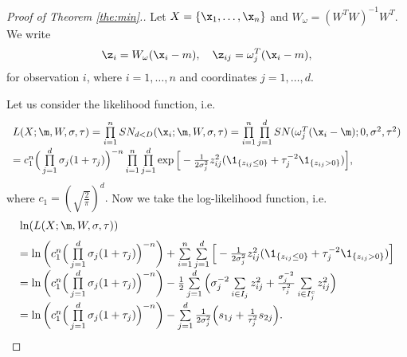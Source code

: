\begin{proof}[Proof of Theorem \ref{the:min}.]
Let $X=\{ \x_1, \ldots, \x_n \}$ and $W_{\omega}=(W^TW)^{-1}W^T$.
We write 
$$
\z_i=  W_{\omega}(\x_i-m), \quad \z_{ij}= \omega_j^T(\x_i-m),
$$
for observation $i$, where $i=1,\ldots,n$ and coordinates $j=1,\ldots,d$.

Let us consider the likelihood function, i.e. 
$$
\begin{array}{l}
L(X;\m,W,\sigma,\tau) = \prod\limits_{i=1}^n SN_{d<D}(\x_i;\m,W,\sigma,\tau) =  
\prod\limits_{i=1}^{n} \prod\limits_{j=1}^{d} SN(\omega_j^T(\x_i - \m) ; 0,\sigma^2,\tau^2)
\\[6pt]
= c_1^n \Big( \prod\limits_{j=1}^{d} \sigma_j(1+\tau_j) \Big)^{-n} %
\prod\limits_{i=1}^{n} \prod\limits_{j=1}^{d} \exp \Big[ -\frac{1}{2\sigma_j^2}z_{ij}^2 (\1_{ \{ z_{ij} \leq 0 \} } + \tau_{j}^{-2} \1_{ \{ z_{ij} > 0 \} }) \Big],
\end{array}
$$
where 
$
c_1=\left( \sqrt{\tfrac{2}{\pi}} \right)^{d}.
$
Now we take the log-likelihood function, i.e.
$$
\begin{array}{l}
\ln(L(X;\m,W,\sigma,\tau)) \\[6pt]
=\ln \bigg( c_1^n \Big( \prod\limits_{j=1}^{d} \sigma_j(1+\tau_j) \Big)^{-n} \bigg) + %
 \sum\limits_{i=1}^{n} \sum\limits_{j=1}^{d} \Big[ -\frac{1}{2\sigma_j^2}z_{ij}^2 (\1_{ \{ z_{ij} \leq 0 \} } + \tau_{j}^{-2} \1_{ \{ z_{ij} > 0 \} })\Big]  \\[6pt]
= \ln \bigg( c_1^n \Big( \prod\limits_{j=1}^{d} \sigma_j(1+\tau_j) \Big)^{-n} \bigg)  -%
  \frac{1}{2} \sum\limits_{j=1}^{d} \Big( \sigma_j^{-2} \sum\limits_{i \in I_{j}}    z_{ij}^2   + \frac{\sigma_j^{-2}}{\tau_{j}^{2} }  \sum\limits_{i \in I_{j}^{c}}   z_{ij}^2  \Big) \\[6pt]
= \ln \bigg( c_1^n \Big( \prod\limits_{j=1}^{d} \sigma_j(1+\tau_j) \Big)^{-n} \bigg)  - 
 \sum\limits_{j=1}^{d} \frac{1}{2\sigma_j^{2}} \Big(  s_{1j}  + \frac{1}{\tau_{j}^{2} }  s_{2j}  \Big).
\end{array}
$$


\end{proof}
